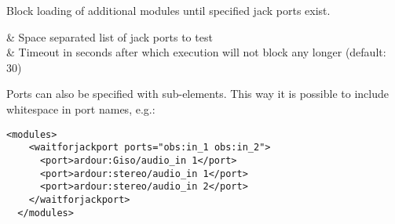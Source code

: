 Block loading of additional modules until specified jack ports exist.

\begin{tscattributes}
     & Space separated list of jack ports to test                         \\
   & Timeout in seconds after which execution will not block any longer (default: 30) \\
\end{tscattributes}

Ports can also be specified with  sub-elements. This way it
is possible to include whitespace in port names, e.g.:

\begin{lstlisting}[numbers=none]
  <modules>
    <waitforjackport ports="obs:in_1 obs:in_2">
      <port>ardour:Giso/audio_in 1</port>
      <port>ardour:stereo/audio_in 1</port>
      <port>ardour:stereo/audio_in 2</port>
    </waitforjackport>
  </modules>
\end{lstlisting}
